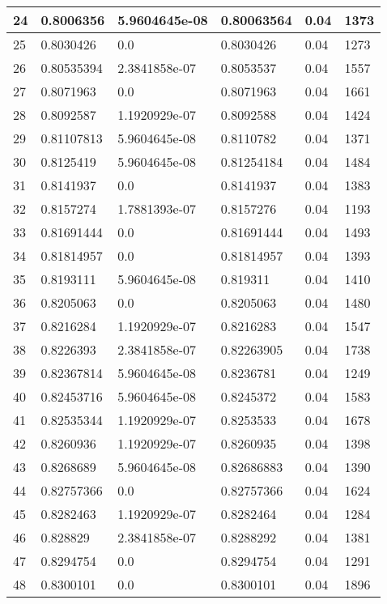 \begin{longtable}{|l|l|l|l|l|l|}
24 & 0.8006356 & 5.9604645e-08 & 0.80063564 & 0.04 & 1373 \\ \hline 
25 & 0.8030426 & 0.0 & 0.8030426 & 0.04 & 1273 \\ \hline 
26 & 0.80535394 & 2.3841858e-07 & 0.8053537 & 0.04 & 1557 \\ \hline 
27 & 0.8071963 & 0.0 & 0.8071963 & 0.04 & 1661 \\ \hline 
28 & 0.8092587 & 1.1920929e-07 & 0.8092588 & 0.04 & 1424 \\ \hline 
29 & 0.81107813 & 5.9604645e-08 & 0.8110782 & 0.04 & 1371 \\ \hline 
30 & 0.8125419 & 5.9604645e-08 & 0.81254184 & 0.04 & 1484 \\ \hline 
31 & 0.8141937 & 0.0 & 0.8141937 & 0.04 & 1383 \\ \hline 
32 & 0.8157274 & 1.7881393e-07 & 0.8157276 & 0.04 & 1193 \\ \hline 
33 & 0.81691444 & 0.0 & 0.81691444 & 0.04 & 1493 \\ \hline 
34 & 0.81814957 & 0.0 & 0.81814957 & 0.04 & 1393 \\ \hline 
35 & 0.8193111 & 5.9604645e-08 & 0.819311 & 0.04 & 1410 \\ \hline 
36 & 0.8205063 & 0.0 & 0.8205063 & 0.04 & 1480 \\ \hline 
37 & 0.8216284 & 1.1920929e-07 & 0.8216283 & 0.04 & 1547 \\ \hline 
38 & 0.8226393 & 2.3841858e-07 & 0.82263905 & 0.04 & 1738 \\ \hline 
39 & 0.82367814 & 5.9604645e-08 & 0.8236781 & 0.04 & 1249 \\ \hline 
40 & 0.82453716 & 5.9604645e-08 & 0.8245372 & 0.04 & 1583 \\ \hline 
41 & 0.82535344 & 1.1920929e-07 & 0.8253533 & 0.04 & 1678 \\ \hline 
42 & 0.8260936 & 1.1920929e-07 & 0.8260935 & 0.04 & 1398 \\ \hline 
43 & 0.8268689 & 5.9604645e-08 & 0.82686883 & 0.04 & 1390 \\ \hline 
44 & 0.82757366 & 0.0 & 0.82757366 & 0.04 & 1624 \\ \hline 
45 & 0.8282463 & 1.1920929e-07 & 0.8282464 & 0.04 & 1284 \\ \hline 
46 & 0.828829 & 2.3841858e-07 & 0.8288292 & 0.04 & 1381 \\ \hline 
47 & 0.8294754 & 0.0 & 0.8294754 & 0.04 & 1291 \\ \hline 
48 & 0.8300101 & 0.0 & 0.8300101 & 0.04 & 1896 \\ \hline 

\end{longtable}
